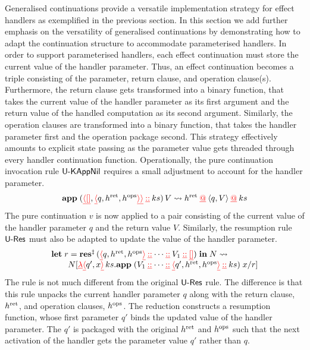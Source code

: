 \documentclass[12pt,phd,lfcs,twoside,openright,logo,leftchapter,normalheadings]{infthesis}
\theoremstyle{plain}
\theoremstyle{definition}
\begin{document}
Generalised continuations provide a versatile implementation strategy
for effect handlers as exemplified in the previous section. In this
section we add further emphasis on the versatility of generalised
continuations by demonstrating how to adapt the continuation structure
to accommodate parameterised handlers. In order to support
parameterised handlers, each effect continuation must store the
current value of the handler parameter. Thus, an effect continuation
becomes a triple consisting of the parameter, return clause, and
operation clause(s). Furthermore, the return clause gets transformed
into a binary function, that takes the current value of the handler
parameter as its first argument and the return value of the handled
computation as its second argument. Similarly, the operation clauses
are transformed into a binary function, that takes the handler
parameter first and the operation package second. This strategy
effectively amounts to explicit state passing as the parameter value
gets threaded through every handler continuation
function. Operationally, the pure continuation invocation rule
$\mathsf{U\textrm{-}KAppNil}$ requires a small adjustment to account for the
handler parameter.
%
\[
  \mathbf{app} \; ({\color{red}\underline{\langle}}{\color{red}\underline{[]}}, {\color{red}\underline{\langle}}q, h^{\mathrm{ret}}, h^{\mathrm{ops}}{\color{red}\underline{\rangle}}{\color{red}\underline{\rangle}} \mathbin{{\color{red}\underline{::}}} ks) \, V \leadsto h^{\mathrm{ret}} \mathbin{{\color{red}\underline{@}}} \langle q,V \rangle \mathbin{{\color{red}\underline{@}}} ks
\]
%
The pure continuation $v$ is now applied to a pair consisting of the
current value of the handler parameter $q$ and the return value
$V$. Similarly, the resumption rule $\mathsf{U\textrm{-}Res}$ must also be
adapted to update the value of the handler parameter.
%
\[
  \bl
  \Let\;r=\Res^\ddag\,(\dRecord{q,\vhret,\vhops} \dcons \dots \dcons V_1 \dcons \dnil)\;\In\;N\reducesto\\
  \qquad N[\dlam \dRecord{q',x}\,\dhk.\kapp\;(V_1 \dcons \dots \dcons \dRecord{q',\vhret,\vhops} \dcons \dhk)\;x/r]
  \el
\]
%
The rule is not much different from the original $\mathsf{U\textrm{-}Res}$
rule. The difference is that this rule unpacks the current handler
parameter $q$ along with the return clause, $h^{\mathrm{ret}}$, and operation
clauses, $h^{\mathrm{ops}}$. The reduction constructs a resumption function,
whose first parameter $q'$ binds the updated value of the handler
parameter. The $q'$ is packaged with the original $h^{\mathrm{ret}}$ and
$h^{\mathrm{ops}}$ such that the next activation of the handler gets the
parameter value $q'$ rather than $q$.
\end{document}
